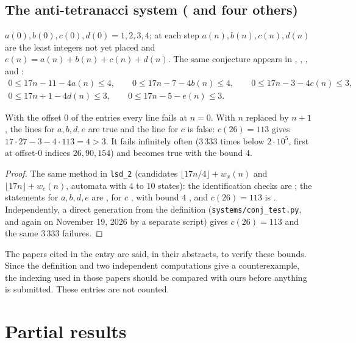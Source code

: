 \subsection{The anti-tetranacci system ( and four others)}\label{s:A299405}
$a(0),b(0),c(0),d(0)=1,2,3,4$; at each step $a(n),b(n),c(n),d(n)$ are the least integers not yet placed and
$e(n)=a(n)+b(n)+c(n)+d(n)$. The same conjecture appears in , , ,
 and :
\begin{gather*}0\le17n-11-4a(n)\le4,\qquad 0\le17n-7-4b(n)\le4,\qquad 0\le17n-3-4c(n)\le3,\\ 0\le17n+1-4d(n)\le3,\qquad 0\le17n-5-e(n)\le3.\end{gather*}
\begin{proposition} With the offset $0$ of the entries every line fails at $n=0$. With $n$ replaced by $n+1$,
the lines for $a,b,d,e$ are true and the line for $c$ is false: $c(26)=113$ gives $17\cdot27-3-4\cdot113=4>3$. It
fails infinitely often ($3\,333$ times below $2\cdot10^5$, first at offset-$0$ indices $26,90,154$) and becomes true
with the bound $4$.\end{proposition}
\begin{proof} The same \Walnut{} method in \texttt{lsd\_2} (candidates $\lfloor17n/4\rfloor+w_x(n)$ and
$\lfloor17n\rfloor+w_e(n)$, automata with $4$ to $10$ states): the identification checks are \TRUE; the statements for
$a,b,d,e$ are \TRUE, for $c$ \FALSE, with bound $4$ \TRUE, and $c(26)=113$ is \TRUE. Independently, a direct
generation from the definition (\texttt{systems/conj\_test.py}, and again on November 19, 2026 by a separate
script) gives $c(26)=113$ and the same $3\,333$ failures. \end{proof}
The papers cited in the entry are said, in their abstracts, to verify these bounds. Since the definition and two
independent computations give a counterexample, the indexing used in those papers should be compared with ours
before anything is submitted. These entries are not counted.

\section{Partial results}\label{s:partial}

